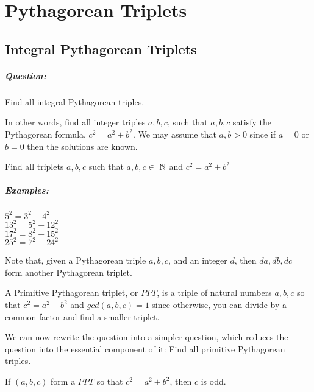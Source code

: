 \documentclass[../main.tex]{subfiles}
\begin{document}
\chapter{Pythagorean Triplets}

\section{Integral Pythagorean Triplets}
\paragraph{Question:}
Find all integral Pythagorean triples.

In other words, find all integer triples \(a, b, c\), such that \(a, b, c\) satisfy the Pythagorean formula,
\(c^2 = a^2 + b^2\). We may assume that \(a, b > 0\) since if \(a = 0\) or \(b = 0\) then the solutions are known.

Find all triplets \(a, b, c\) such that $a, b, c \in $ $\mathbb{N}$ and $c^2 = a^2 + b^2$

\paragraph{Examples:}
\begin{center}
    $5^2 = 3^2 + 4^2$ \\
    $13^2 = 5^2 + 12^2$ \\
    $17^2 = 8^2 + 15^2$ \\
    $25^2 = 7^2 + 24^2$ 
\end{center}
Note that, given a Pythagorean triple $a,b,c$, and an integer $d$, then $da,db,dc$ form another Pythagorean triplet.

\begin{defn}
    A Primitive Pythagorean triplet, or $PPT$, is a triple of natural numbers $a, b, c$ so that $c^2=a^2+b^2$ and $gcd(a, b, c) = 1$ since otherwise, you can divide by a common factor and find a smaller triplet.
\end{defn}

We can now rewrite the question into a simpler question, which reduces the question into the essential component of it: Find all primitive Pythagorean triples.

\begin{prop}
    If $(a,b,c)$ form a $PPT$ so that $c^2=a^2+b^2$, then $c$ is odd.
\end{prop}
\end{document}

